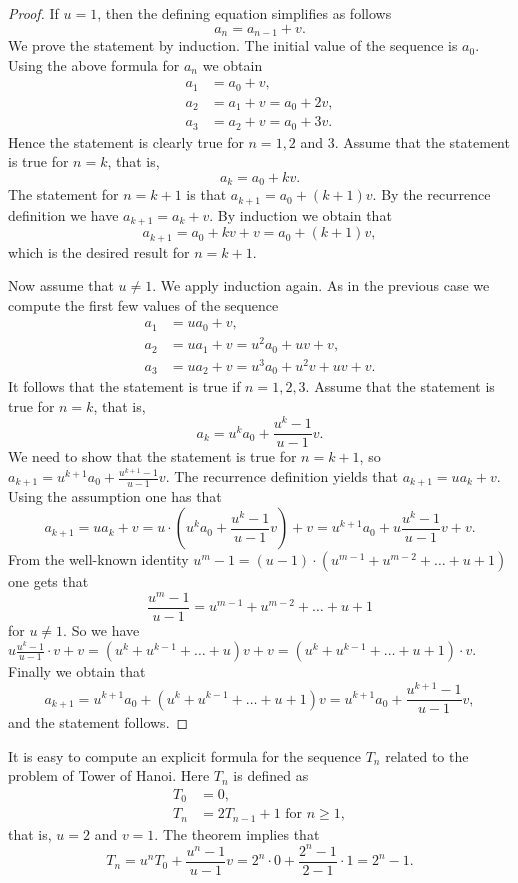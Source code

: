\begin{proof}
If $u=1$, then the defining equation simplifies as follows
$$
a_n=a_{n-1}+v.
$$
We prove the statement by induction.
The initial value of the sequence is $a_0$. Using the above formula for $a_n$ we obtain
\begin{align*}
a_1&=a_0+v,\\
a_2&=a_1+v=a_0+2v,\\
a_3&=a_2+v=a_0+3v.
\end{align*}
Hence the statement is clearly true for $n=1,2$ and 3. Assume that the statement is true
for $n=k$, that is, 
$$
a_k=a_0+kv.
$$
The statement for $n=k+1$ is that $a_{k+1}=a_0+(k+1)v$. By the recurrence definition we
have $a_{k+1}=a_{k}+v$. By induction we obtain that 
$$
a_{k+1}=a_0+kv+v=a_0+(k+1)v,
$$
which is the desired result for $n=k+1$.

Now assume that $u\neq 1$. We apply induction again. As in the previous case we compute the first few values of the sequence
\begin{align*}
a_1&=ua_0+v,\\
a_2&=ua_1+v=u^2a_0+uv+v,\\
a_3&=ua_2+v=u^3a_0+u^2v+uv+v.
\end{align*}
It follows that the statement is true if $n=1,2,3$. Assume that the statement is true
for $n=k$, that is, 
$$
a_k=u^ka_0+\frac{u^k-1}{u-1}v.
$$
We need to show that the statement is true for $n=k+1$, so $a_{k+1}=u^{k+1}a_0+\frac{u^{k+1}-1}{u-1}v$.
The recurrence definition yields that
$a_{k+1}=ua_{k}+v$. Using the assumption one has that
$$
a_{k+1}=ua_{k}+v=u\cdot \left(u^ka_0+\frac{u^k-1}{u-1}v\right)+v=u^{k+1}a_0+u\frac{u^k-1}{u-1}v+v.
$$
From the well-known identity $u^m-1=(u-1)\cdot (u^{m-1}+u^{m-2}+\ldots+u+1)$ one gets that 
$$
\frac{u^m-1}{u-1}=u^{m-1}+u^{m-2}+\ldots+u+1
$$
for $u\neq 1$. So we have $u\frac{u^k-1}{u-1}\cdot v+v=(u^k+u^{k-1}+\ldots+u)v+v=(u^k+u^{k-1}+\ldots+u+1)\cdot v$.
Finally we obtain that
$$
a_{k+1}=u^{k+1}a_0+(u^k+u^{k-1}+\ldots+u+1)v=u^{k+1}a_0+\frac{u^{k+1}-1}{u-1}v, 
$$
and the statement follows.
\end{proof}
It is easy to compute an explicit formula for the sequence $T_n$ related to the problem of Tower of Hanoi.
Here $T_n$ is defined as 
\begin{align*}
T_0&=0,\\
T_n&=2T_{n-1}+1 \mbox{ for }n\geq 1,
\end{align*}
that is, $u=2$ and $v=1$. The theorem implies that 
$$
T_n=u^nT_0+\frac{u^n-1}{u-1}v=2^n\cdot 0+\frac{2^n-1}{2-1}\cdot 1=2^n-1.
$$

